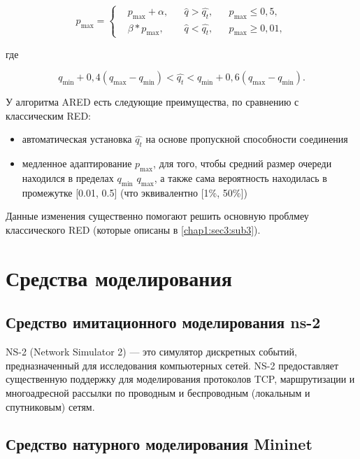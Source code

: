 \[
p_{\max} = \left\{
  \begin{aligned}
   & p_{\max}+\alpha, && \hat{q}>\hat{q_{t}}, && p_{\max} \leqslant 0,5, \\
   & \beta * p_{\max}, && \hat{q}<\hat{q_{t}}, && p_{\max} \geqslant 0,01, 
  \end{aligned}
\right.
\]

где

\[
q_{\min}+0,4\left(q_{\max}-q_{\min}\right) < \hat{q_t} < q_{\min}+0,6\left(q_{\max}-q_{\min}\right).
\]

У алгоритма ARED есть следующие преимущества, по сравнению с классическим RED:

\begin{itemize}

  \item автоматическая установка $\hat{q_t}$ на основе пропускной способности
    соединения

  \item медленное адаптирование $p_{\max}$, для того, чтобы средний размер
    очереди находился в пределах $q_{\min}$ $q_{\max}$, а также сама
    вероятность находилась в промежутке [0.01, 0.5] (что эквивалентно [1\%,
    50\%])

\end{itemize}

Данные изменения существенно помогают решить основную проблмеу классического RED (которые описаны в \ref{chap1:sec3:sub3}).


\section{Средства моделирования}
\label{chap1:sec3}

\subsection{Средство имитационного моделирования ns-2}
\label{chap1:sec3:sub1}

NS-2 (Network Simulator 2) --- это симулятор дискретных событий,
предназначенный для исследования компьютерных сетей. NS-2 предоставляет
существенную поддержку для моделирования протоколов TCP, маршрутизации и
многоадресной рассылки по проводным и беспроводным (локальным и спутниковым)
сетям.

\subsection{Средство натурного моделирования Mininet}
\label{chap1:sec3:sub2}

